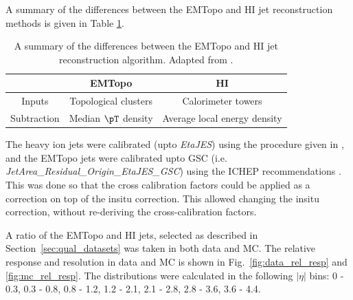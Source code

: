 

A summary of the differences between the EMTopo and HI jet reconstruction methods is given in Table \ref{table:algo_diff}.
\begin{table}[h]
\centering
\caption{A summary of the differences between the EMTopo and HI jet reconstruction algorithm. Adapted from \cite{HIjesnote}.}
\begin{tabular}{|c|c|c|}
\hline
            & EMTopo                 & HI                           \\ \hline
Inputs      & Topological clusters   & Calorimeter towers           \\ \hline
Subtraction & Median $\pT$ density & Average local energy density \\ \hline
\end{tabular}
\label{table:algo_diff}
\end{table}




The heavy ion jets were calibrated (upto {\it EtaJES}) using the procedure given in \cite{HICalib}, and the EMTopo jets were calibrated upto GSC (i.e. {\it JetArea\_Residual\_Origin\_EtaJES\_GSC}) using the ICHEP recommendations \cite{CalibReco}. This was done so that the cross calibration factors could be applied as a correction on top of the insitu correction. This allowed changing the insitu correction, without re-deriving the cross-calibration factors. 

A ratio of the EMTopo and HI jets, selected as described in Section~\ref{sec:qual_datasets} was taken in both data and MC. The relative response and resolution in data and MC is shown in Fig.~\ref{fig:data_rel_resp} and \ref{fig:mc_rel_resp}. The distributions were calculated in the following $|\eta|$ bins: 0 - 0.3, 0.3 - 0.8, 0.8 - 1.2, 1.2 - 2.1, 2.1 - 2.8, 2.8 - 3.6, 3.6 - 4.4.

